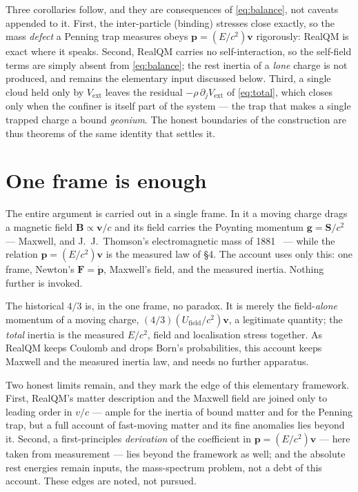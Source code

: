 \documentclass[11pt]{article}
\begin{document}
Three corollaries follow, and they are consequences of \eqref{eq:balance}, not caveats appended to it. First, the
inter-particle (binding) stresses close exactly, so the mass \emph{defect} a Penning trap measures obeys
$\mathbf p=(E/c^2)\mathbf v$ rigorously: RealQM is exact where it speaks. Second, RealQM carries no
self-interaction, so the self-field terms are simply absent from \eqref{eq:balance}; the rest inertia of a
\emph{lone} charge is not produced, and remains the elementary input discussed below. Third, a single cloud held
only by $V_{\text{ext}}$ leaves the residual $-\rho\,\partial_j V_{\text{ext}}$ of \eqref{eq:total}, which closes
only when the confiner is itself part of the system --- the trap that makes a single trapped charge a bound
\emph{geonium}. The honest boundaries of the construction are thus theorems of the same identity that settles it.

\section{One frame is enough}
The entire argument is carried out in a single frame. In it a moving charge drags a magnetic field
$\mathbf B\propto\mathbf v/c$ and its field carries the Poynting momentum $\mathbf g=\mathbf S/c^2$ --- Maxwell,
and J.~J.~Thomson's electromagnetic mass of 1881~\cite{Thomson} --- while the relation
$\mathbf p=(E/c^2)\mathbf v$ is the measured law of \S4. The account uses only this: one frame, Newton's
$\mathbf F=\dot{\mathbf p}$, Maxwell's field, and the measured inertia. Nothing further is invoked.

The historical $4/3$ is, in the one frame, no paradox. It is merely the field-\emph{alone} momentum of a moving
charge, $(4/3)(U_{\text{field}}/c^2)\mathbf v$, a legitimate quantity; the \emph{total} inertia is the measured
$E/c^2$, field and localisation stress together. As RealQM keeps Coulomb and drops Born's probabilities, this
account keeps Maxwell and the measured inertia law, and needs no further apparatus.

Two honest limits remain, and they mark the edge of this elementary framework. First, RealQM's matter description
and the Maxwell field are joined only to leading order in $v/c$ --- ample for the inertia of bound matter and for
the Penning trap, but a full account of fast-moving matter and its fine anomalies lies beyond it. Second, a
first-principles \emph{derivation} of the coefficient in $\mathbf p=(E/c^2)\mathbf v$ --- here taken from
measurement --- lies beyond the framework as well; and the absolute rest energies remain inputs, the mass-spectrum
problem, not a debt of this account. These edges are noted, not pursued.
\end{document}
